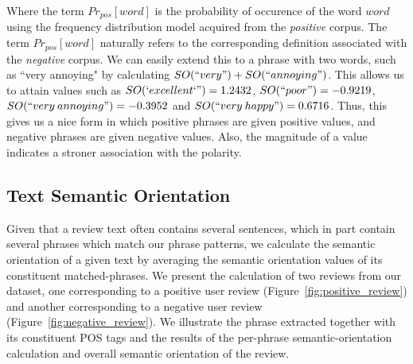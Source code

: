 \documentclass[11pt]{report} %
\begin{document}
Where the term $Pr_{pos}[word]$ is the probability of occurence of the word $word$ using the frequency distribution model acquired from the \textit{positive} corpus. The term $Pr_{pos}[word]$ naturally refers to the corresponding definition associated with the \textit{negative} corpus. We can easily extend this to a phrase with two words, such as ``very annoying" by calculating $SO(``very") + SO(``annoying")$. This allows us to attain values such as $SO(`excellent`")=1.2432$, $SO(``poor")=-0.9219$, $SO(``very \: annoying")=-0.3952$ and $SO(``very \: happy")=0.6716$. Thus, this gives us a nice form in which positive phrases are given positive values, and negative phrases are given negative values. Also, the magnitude of a value indicates a stroner association with the polarity.

\subsection{Text Semantic Orientation}
Given that a review text often contains several sentences, which in part contain several phrases which match our phrase patterns, we calculate the semantic orientation of a given text by averaging the semantic orientation values of its constituent matched-phrases. We present the calculation of two reviews from our dataset, one corresponding to a positive user review (Figure~\ref{fig:positive_review}) and another corresponding to a negative user review (Figure~\ref{fig:negative_review}). We illustrate the phrase extracted together with its constituent POS tags and the results of the per-phrase semantic-orientation calculation and overall semantic orientation of the review.

\pagebreak
\end{document}
